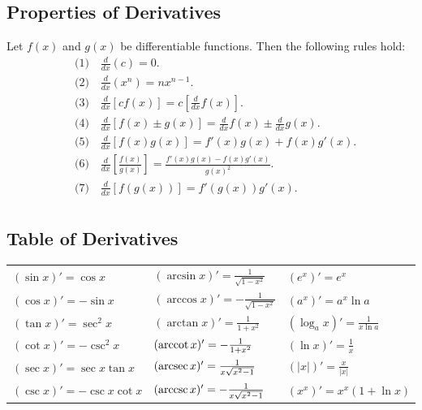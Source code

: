 \documentclass[a4paper,11pt]{article}
\theoremstyle{definition}
\theoremstyle{plain}
\theoremstyle{remark}
\begin{document}
\subsection{Properties of Derivatives}

\begin{tcolorbox}
    Let $f(x)$ and $g(x)$ be differentiable functions. Then the following rules hold:
    \[
    \begin{aligned}
        &\text{(1)} \quad \frac{d}{dx}(c) = 0. \\[8pt]  
        &\text{(2)} \quad \frac{d}{dx}(x^n) = nx^{n-1}. \\[8pt]
        &\text{(3)} \quad \frac{d}{dx}[cf(x)] = c[\frac{d}{dx}f(x)]. \\[8pt]
        &\text{(4)} \quad \frac{d}{dx}[f(x) \pm g(x)] = \frac{d}{dx}f(x) \pm \frac{d}{dx}g(x). \\[8pt]
        &\text{(5)} \quad \frac{d}{dx}[f(x)g(x)] = f'(x)g(x) + f(x)g'(x). \\[8pt]
        &\text{(6)} \quad \frac{d}{dx}[\frac{f(x)}{g(x)}] = \frac{f'(x)g(x) - f(x)g'(x)}{g(x)^2}. \\[8pt]
        &\text{(7)} \quad \frac{d}{dx}[f(g(x))] = f'(g(x))g'(x). \\[8pt]
    \end{aligned}
    \]
\end{tcolorbox}




\subsection{Table of Derivatives}

\begin{tcolorbox}
    \begin{tabularx}{\textwidth}{X|X|X}
         $(\sin x)' = \cos x$ & 
         $(\arcsin x)' = \frac{1}{\sqrt{1-x^2}}$ & 
         $(e^x)' = e^x$ \\[10pt]
         
         $(\cos x)' = -\sin x$ & 
         $(\arccos x)' = -\frac{1}{\sqrt{1-x^2}}$ & 
         $(a^x)' = a^x\ln{a}$ \\[10pt]
         
         $(\tan x)' = \sec^2 x$ & 
         $(\arctan x)' = \frac{1}{1+x^2}$ & 
         $(\log_a{x})' = \frac{1}{x\ln{a}}$ \\[10pt]
         
         $(\cot x)' = -\csc^2 x$ & 
         $(\arccot x)' = -\frac{1}{1+x^2}$ & 
         $(\ln{x})' = \frac{1}{x}$ \\[10pt]
         
         $(\sec x)' = \sec x \tan x $ & 
         $(\arcsec x)' = \frac{1}{x\sqrt{x^2-1}}$ & 
         $(\left| x \right|)' = \frac{x}{|x|}$ \\[10pt]
         
         $(\csc x)' = -\csc x \cot x $ & 
         $(\arccsc x)' = -\frac{1}{x\sqrt{x^2-1}}$ & 
         $(x^x)' = x^x(1+\ln{x})$ \\[10pt]
    \end{tabularx}
\end{tcolorbox}
\end{document}
